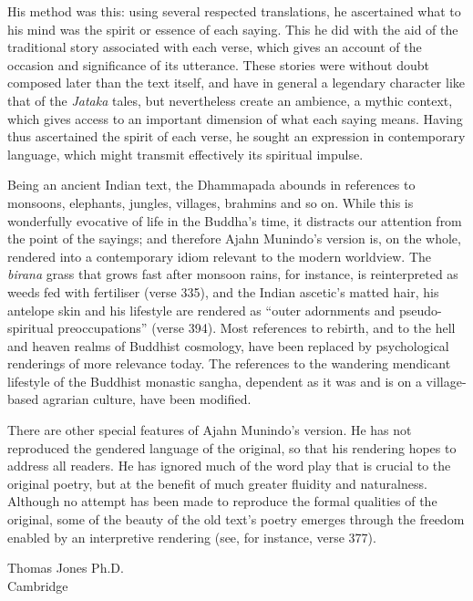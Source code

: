 His method was this: using several respected translations, he ascertained what to his mind was the spirit or essence of each saying. This he did with the aid of the traditional story associated with each verse, which gives an account of the occasion and significance of its utterance. These stories were without doubt composed later than the text itself, and have in general a legendary character like that of the \emph{Jataka} tales, but nevertheless create an ambience, a mythic context, which gives access to an important dimension of what each saying means. Having thus ascertained the spirit of each verse, he sought an expression in contemporary language, which might transmit effectively its spiritual impulse.

Being an ancient Indian text, the Dhammapada abounds in references to monsoons, elephants, jungles, villages, brahmins and so on. While this is wonderfully evocative of life in the Buddha’s time, it distracts our attention from the point of the sayings; and therefore Ajahn Munindo’s version is, on the whole, rendered into a contemporary idiom relevant to the modern worldview. The \emph{birana} grass that grows fast after monsoon rains, for instance, is reinterpreted as weeds fed with fertiliser (verse 335), and the Indian ascetic’s matted hair, his antelope skin and his lifestyle are rendered as “outer adornments and pseudo-spiritual preoccupations” (verse 394). Most references to rebirth, and to the hell and heaven realms of Buddhist cosmology, have been replaced by psychological renderings of more relevance today. The references to the wandering mendicant lifestyle of the Buddhist monastic sangha, dependent as it was and is on a village-based agrarian culture, have been modified.

There are other special features of Ajahn Munindo’s version. He has not reproduced the gendered language of the original, so that his rendering hopes to address all readers. He has ignored much of the word play that is crucial to the original poetry, but at the benefit of much greater fluidity and naturalness. Although no attempt has been made to reproduce the formal qualities of the original, some of the beauty of the old text’s poetry emerges through the freedom enabled by an interpretive rendering (see, for instance, verse 377).

\bigskip

{\raggedleft
Thomas Jones Ph.D.\\
Cambridge
\par}
